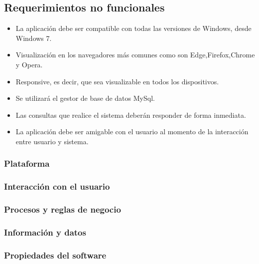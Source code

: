\subsection{Requerimientos no funcionales}
\begin{itemize}
\item La aplicación debe ser compatible con todas las versiones de Windows, desde Windows 7.
\item Visualización en los navegadores más comunes como son Edge,Firefox,Chrome y Opera.
\item Responsive, es decir, que sea visualizable en todos los dispositivos.
\item Se utilizará el gestor de base de datos MySql.
\item Las consultas que realice el sistema deberán responder de forma inmediata.
\item La aplicación debe ser amigable con el usuario al momento de la interacción entre usuario y sistema.
\end{itemize}
\subsubsection{Plataforma}
\subsubsection{Interacción con el usuario}
\subsubsection{Procesos y reglas de negocio}
\subsubsection{Información y datos}
\subsubsection{Propiedades del software}

%
%

















